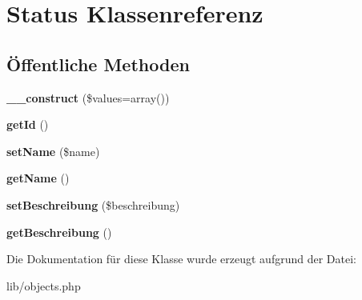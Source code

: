 \hypertarget{classStatus}{\section{\-Status \-Klassenreferenz}
\label{classStatus}
}
\subsection*{Öffentliche \-Methoden}
\begin{DoxyCompactItemize}
\item 
\hypertarget{classStatus_a2a52b74efa937b48826aa426feca36dd}{{\bfseries \-\_\-\-\_\-construct} (\$values=array())}\label{classStatus_a2a52b74efa937b48826aa426feca36dd}

\item 
\hypertarget{classStatus_af744c3badd8e8bc9cf748025ef9a554e}{{\bfseries get\-Id} ()}\label{classStatus_af744c3badd8e8bc9cf748025ef9a554e}

\item 
\hypertarget{classStatus_a9defcdef8d9ba3f9ef3fdc9c7e6d5ad1}{{\bfseries set\-Name} (\$name)}\label{classStatus_a9defcdef8d9ba3f9ef3fdc9c7e6d5ad1}

\item 
\hypertarget{classStatus_a4ee39b598b62c32ef010d5d5ce72a81a}{{\bfseries get\-Name} ()}\label{classStatus_a4ee39b598b62c32ef010d5d5ce72a81a}

\item 
\hypertarget{classStatus_a4464234c107f30785a181b034eba28d9}{{\bfseries set\-Beschreibung} (\$beschreibung)}\label{classStatus_a4464234c107f30785a181b034eba28d9}

\item 
\hypertarget{classStatus_a60df18424a5a08961432976d3cc88398}{{\bfseries get\-Beschreibung} ()}\label{classStatus_a60df18424a5a08961432976d3cc88398}

\end{DoxyCompactItemize}


\-Die \-Dokumentation für diese \-Klasse wurde erzeugt aufgrund der \-Datei\-:\begin{DoxyCompactItemize}
\item 
lib/objects.\-php\end{DoxyCompactItemize}
